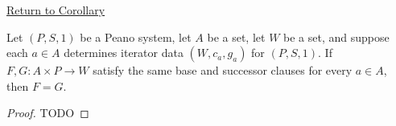 \newpage
{}
\label{prf:uniqueness-of-binary-iterator-operations}

\begin{remark*}[Return]
\hyperref[cor:uniqueness-of-binary-iterator-operations]{Return to Corollary}
\end{remark*}

\begin{theorem*}
Let $(P,S,1)$ be a Peano system, let $A$ be a set, let $W$ be a set, and
suppose each $a\in A$ determines iterator data $(W,c_a,g_a)$ for $(P,S,1)$.
If $F,G:A\times P\to W$ satisfy the same base and successor clauses for every
$a\in A$, then $F=G$.
\end{theorem*}

\begin{proof}
TODO
\end{proof}
